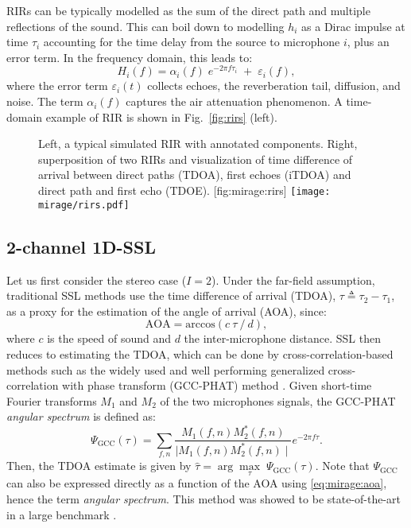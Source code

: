 RIRs can be typically modelled as the sum of the direct path and multiple reflections of the sound. This can boil down to modelling $h_i$ as a Dirac impulse at time $\tau_i$ accounting for the time delay from the source to microphone $i$, plus an error term. In the frequency domain, this leads to:
\begin{equation}\label{eq:mirage:rir}
H_i(f) = \alpha_i(f) \; e^{- 2 \pi f \tau_i} \; + \; \varepsilon_i(f),
\end{equation}
where the error term $\varepsilon_i(t)$ collects echoes, the reverberation tail, diffusion, and noise. The term $\alpha_i(f)$ captures the air attenuation phenomenon. A time-domain example of RIR is shown in Fig.~\cref{fig:rirs} (left).

\begin{figure}[t]
    \begin{sidecaption}{%
        Left, a typical simulated RIR with annotated components. Right, superposition of two RIRs and visualization of time difference
        of arrival between direct paths (TDOA), first echoes (iTDOA) and direct path and first echo (TDOE).
    }[fig:mirage:rirs]
    \centering
    \texttt{[image: mirage/rirs.pdf]}
    \end{sidecaption}
\end{figure}


\subsection{2-channel 1D-SSL}\label{subsec:mirage:1D-SSL}
Let us first consider the stereo case ($I=2$). Under the far-field assumption,
traditional SSL methods use the time difference of arrival (TDOA),
$\tau \triangleq \tau_2 - \tau_1$, as a proxy for the estimation of the angle of arrival (AOA), since:
\begin{equation}\label{eq:mirage:aoa}
\text{AOA} = \text{arccos} \left(c \: \tau \: / \:d \right),
\end{equation}
where $c$ is the speed of sound and $d$ the inter-microphone distance.
SSL then reduces to estimating the TDOA, which can be done by cross-correlation-based methods such as
the widely used and well performing generalized cross-correlation
with phase transform (GCC-PHAT) method \cite{Knapp1976,Blandin2012}.
Given short-time Fourier transforms $M_1$ and $M_2$ of the two microphones signals,
the GCC-PHAT \textit{angular spectrum} is defined as:
\begin{equation}\label{eq:mirage:gccphatcontrast}
\Psi_\text{GCC}(\tau) = \sum_{f,n}\frac{M_1(f,n) M_2^*(f,n)}{\mid M_1(f,n) M_2^*(f,n) \mid} e^{-2\pi f \tau}.
\end{equation}
Then, the TDOA estimate is given by $\hat{\tau} = \arg \underset{\tau}{\max} \; \Psi_\text{GCC}(\tau)$.
Note that $\Psi_\text{GCC}$ can also be expressed directly as a function of the
AOA using \eqref{eq:mirage:aoa}, hence the term \textit{angular spectrum}.
This method was showed to be state-of-the-art in a large benchmark \cite{Blandin2012}.

